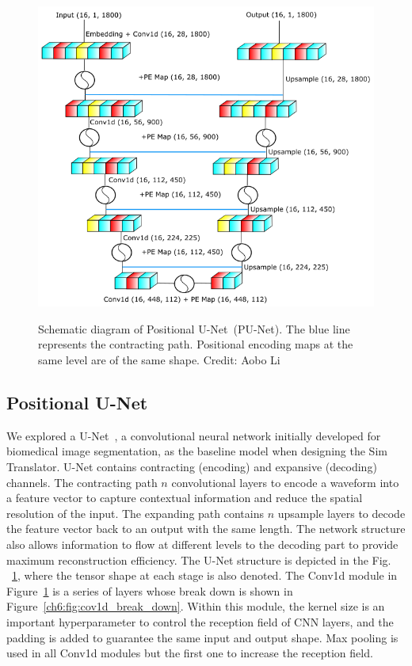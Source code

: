\begin{figure}[htb!]
\centering
    \includegraphics[width=0.7\linewidth]{ch6/figs/unet.png}
    \label{fig:cpunet}
    \caption{Schematic diagram of Positional U-Net~(PU-Net). The blue line represents the contracting path. Positional encoding maps at the same level are of the same shape. Credit: Aobo Li}
   \label{fig:network_schematic}
\end{figure}



\subsection{Positional U-Net}

We explored a U-Net~\cite{UNet}, a convolutional neural network initially developed for biomedical image segmentation, as the baseline model when designing the Sim Translator. U-Net contains contracting (encoding) and expansive (decoding) channels. The contracting path $n$ convolutional layers to encode a waveform into a feature vector to capture contextual information and reduce the spatial resolution of the input. The expanding path contains $n$ upsample layers to decode the feature vector back to an output with the same length. The network structure also allows information to flow at different levels to the decoding part to provide maximum reconstruction efficiency. The U-Net structure is depicted in the Fig. ~\ref{fig:network_schematic}, where the tensor shape at each stage is also denoted. The Conv1d module in Figure~\ref{fig:network_schematic} is a series of layers whose break down is shown in Figure~\ref{ch6:fig:cov1d_break_down}. Within this module, the kernel size is an important hyperparameter to control the reception field of CNN layers, and the padding is added to guarantee the same input and output shape. Max pooling is used in all Conv1d modules but the first one to increase the reception field. 

